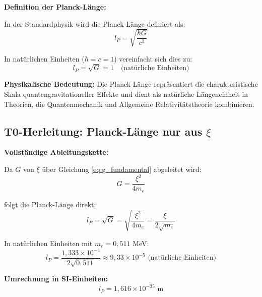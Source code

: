 \documentclass[12pt,a4paper]{article}
\begin{document}
	\begin{derivation}
		\textbf{Definition der Planck-L{\"a}nge:}
		
		In der Standardphysik wird die Planck-L{\"a}nge definiert als:
		\begin{equation}
			l_P = \sqrt{\frac{\hbar G}{c^3}}
			\label{eq:planck_length_standard}
		\end{equation}
		
		In nat{\"u}rlichen Einheiten ($\hbar = c = 1$) vereinfacht sich dies zu:
		\begin{equation}
			\boxed{l_P = \sqrt{G} = 1 \quad \text{(nat{\"u}rliche Einheiten)}}
			\label{eq:planck_natural}
		\end{equation}
		
		\textbf{Physikalische Bedeutung:} Die Planck-L{\"a}nge repr{\"a}sentiert die charakteristische Skala quantengravitationeller Effekte und dient als nat{\"u}rliche L{\"a}ngeneinheit in Theorien, die Quantenmechanik und Allgemeine Relativit{\"a}tstheorie kombinieren.
	\end{derivation}
	
	\subsection{T0-Herleitung: Planck-L{\"a}nge nur aus $\xi$}
	
	\begin{keyresult}
		\textbf{Vollst{\"a}ndige Ableitungskette:}
		
		Da $G$ von $\xi$ {\"u}ber Gleichung \eqref{eq:g_fundamental} abgeleitet wird:
		\begin{equation}
			G = \frac{\xi^2}{4 m_e}
		\end{equation}
		
		folgt die Planck-L{\"a}nge direkt:
		\begin{equation}
			l_P = \sqrt{G} = \sqrt{\frac{\xi^2}{4 m_e}} = \frac{\xi}{2\sqrt{m_e}}
		\end{equation}
		
		In nat{\"u}rlichen Einheiten mit $m_e = 0{,}511$ MeV:
		\begin{equation}
			l_P = \frac{1{,}333 \times 10^{-4}}{2\sqrt{0{,}511}} \approx 9{,}33 \times 10^{-5} \text{ (nat{\"u}rliche Einheiten)}
		\end{equation}
		
		\textbf{Umrechnung in SI-Einheiten:}
		\begin{equation}
			\boxed{l_P = 1{,}616 \times 10^{-35} \text{ m}}
		\end{equation}
	\end{keyresult}
	
\end{document}
